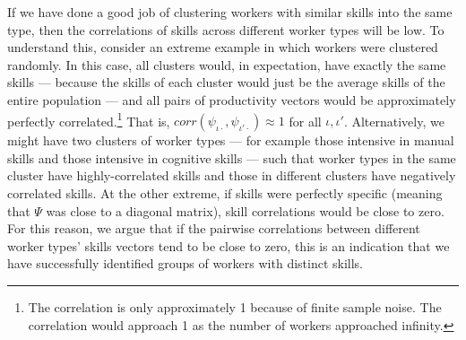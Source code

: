 \documentclass[12pt]{article}
\def\i{\iota}
\theoremstyle{definition}
\theoremstyle{plain}
\begin{document}
If we have done a good job of clustering workers with similar skills into the same type, then the correlations of skills across different worker types will be low. To understand this, consider an extreme example in which workers were clustered randomly. In this case, all clusters would, in expectation, have exactly the same skills --- because the skills of each cluster would just be the average skills of the entire population --- and all pairs of productivity vectors would be approximately perfectly correlated.\footnote{The correlation is only approximately 1 because of finite sample noise. The correlation would approach 1 as the number of workers approached infinity.} That is, $corr(\psi_{\i\cdot},\psi_{\i'\cdot}) \approx 1$ for all $\i,\i'$.  Alternatively, we might have two clusters of worker types --- for example those intensive in manual skills and those intensive in cognitive skills --- such that worker types in the same cluster have highly-correlated skills and those in different clusters have  negatively correlated skills. At the other extreme, if skills were perfectly specific (meaning that $\Psi$ was close to a diagonal matrix), skill correlations would be close to zero. For this reason, we argue that if the pairwise correlations between different worker types’ skills vectors tend to be close to zero, this is an indication that we have successfully identified groups of workers with distinct skills. 

\end{document}
